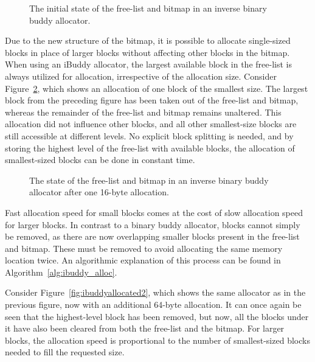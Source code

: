 \begin{figure}[h]
  \centering
  
  \caption{The initial state of the free-list and bitmap in an inverse binary buddy allocator.}
  \label{fig:ibuddyinitial}
\end{figure}

Due to the new structure of the bitmap, it is possible to allocate single-sized blocks in place of larger blocks without affecting other blocks in the bitmap. When using an iBuddy allocator, the largest available block in the free-list is always utilized for allocation, irrespective of the allocation size. Consider Figure~\ref{fig:ibuddyallocated}, which shows an allocation of one block of the smallest size. The largest block from the preceding figure has been taken out of the free-list and bitmap, whereas the remainder of the free-list and bitmap remains unaltered. This allocation did not influence other blocks, and all other smallest-size blocks are still accessible at different levels. No explicit block splitting is needed, and by storing the highest level of the free-list with available blocks, the allocation of smallest-sized blocks can be done in constant time.

\begin{figure}[h]
  \centering
  
  \caption{The state of the free-list and bitmap in an inverse binary buddy allocator after one
    16-byte allocation.}
  \label{fig:ibuddyallocated}
\end{figure}

Fast allocation speed for small blocks comes at the cost of slow allocation speed for larger blocks. In contrast to a binary buddy allocator, blocks cannot simply be removed, as there are now overlapping smaller blocks present in the free-list and bitmap. These must be removed to avoid allocating the same memory location twice. An algorithmic explanation of this process can be found in Algorithm~\ref{alg:ibuddy_alloc}.

Consider Figure~\ref{fig:ibuddyallocated2}, which shows the same allocator as in the previous figure, now with an additional 64-byte allocation. It can once again be seen that the highest-level block has been removed, but now, all the blocks under it have also been cleared from both the free-list and the bitmap. For larger blocks, the allocation speed is proportional to the number of smallest-sized blocks needed to fill the requested size.

